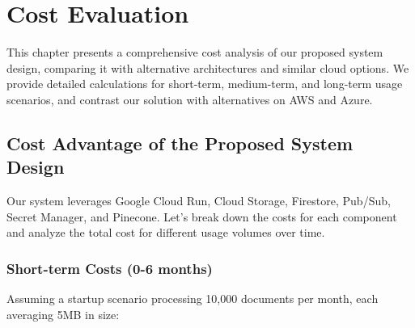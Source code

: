 \documentclass[a4paper, 12pt]{report}
\begin{document}
\chapter{Cost Evaluation}

This chapter presents a comprehensive cost analysis of our proposed system design, comparing it with alternative architectures and similar cloud options. We provide detailed calculations for short-term, medium-term, and long-term usage scenarios, and contrast our solution with alternatives on AWS and Azure.

\section{Cost Advantage of the Proposed System Design}

Our system leverages Google Cloud Run, Cloud Storage, Firestore, Pub/Sub, Secret Manager, and Pinecone. Let's break down the costs for each component and analyze the total cost for different usage volumes over time.

\subsection{Short-term Costs (0-6 months)}

Assuming a startup scenario processing 10,000 documents per month, each averaging 5MB in size:
\end{document}

